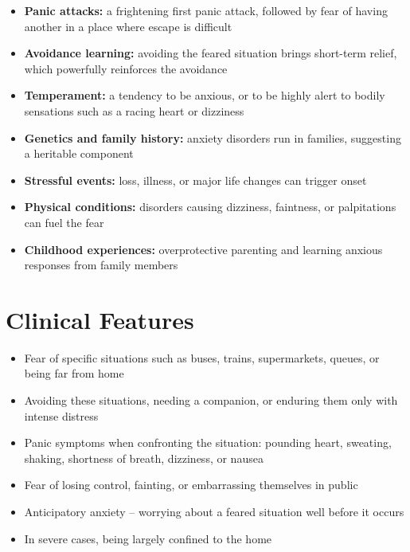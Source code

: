 \begin{itemize}
    \item \textbf{Panic attacks:} a frightening first panic attack, followed by fear of having another in a place where escape is difficult
    \item \textbf{Avoidance learning:} avoiding the feared situation brings short-term relief, which powerfully reinforces the avoidance
    \item \textbf{Temperament:} a tendency to be anxious, or to be highly alert to bodily sensations such as a racing heart or dizziness
    \item \textbf{Genetics and family history:} anxiety disorders run in families, suggesting a heritable component
    \item \textbf{Stressful events:} loss, illness, or major life changes can trigger onset
    \item \textbf{Physical conditions:} disorders causing dizziness, faintness, or palpitations can fuel the fear
    \item \textbf{Childhood experiences:} overprotective parenting and learning anxious responses from family members
\end{itemize}

\section*{Clinical Features}
\begin{itemize}
    \item Fear of specific situations such as buses, trains, supermarkets, queues, or being far from home
    \item Avoiding these situations, needing a companion, or enduring them only with intense distress
    \item Panic symptoms when confronting the situation: pounding heart, sweating, shaking, shortness of breath, dizziness, or nausea
    \item Fear of losing control, fainting, or embarrassing themselves in public
    \item Anticipatory anxiety -- worrying about a feared situation well before it occurs
    \item In severe cases, being largely confined to the home
\end{itemize}

